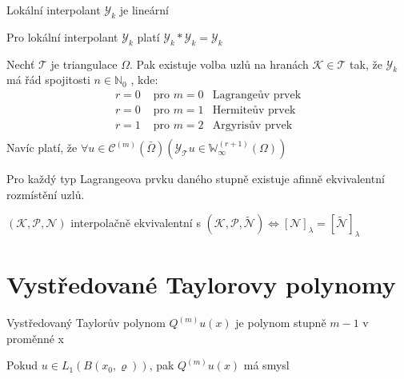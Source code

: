 \documentclass[../main.tex]{subfiles}
\begin{document}
\begin{claim}
    Lokální interpolant $\mathcal{Y}_k$ je lineární
\end{claim}

\begin{claim}
    Pro lokální interpolant $\mathcal{Y}_k$ platí  $\mathcal{Y}_k * \mathcal{Y}_k = \mathcal{Y}_k$
\end{claim}


\begin{claim}
    Nechť $\mathcal{T}$ je triangulace $\Omega$. Pak existuje volba uzlů na hranách $\mathcal{K}\in\mathcal{T}$ tak, že $\mathcal{Y}_k$ má řád spojitosti $n\in\mathbb{N}_0$ , kde:
\begin{align}
    r = 0 &  \text{ pro } m = 0    & \text{Lagrangeův prvek} \\ 
    r = 0 &  \text{ pro } m = 1    & \text{Hermiteův prvek} \\ 
    r = 1 &  \text{ pro } m = 2    & \text{Argyrisův prvek} \\ 
\end{align}
    Navíc platí, že $\forall u \in \mathcal{C}^{(m)}(\bar{\Omega}) (\mathcal{Y}_\mathcal{T}u\in \mathbb{W}_\infty^{(r+1)}(\Omega))$
\end{claim}



\begin{claim}
    Pro každý typ Lagrangeova prvku daného stupně existuje afinně ekvivalentní rozmístění uzlů.
\end{claim}


\begin{claim}
    $(\mathcal{K}, \mathcal{P}, \mathcal{N})$ interpolačně ekvivalentní s $({\mathcal{K}}, {\mathcal{P}}, \tilde{\mathcal{N}}) \Leftrightarrow [\mathcal{N}]_\lambda = [\tilde{\mathcal{N}}]_\lambda $
\end{claim}


\section{Vystředované Taylorovy polynomy}


\begin{claim}[T1]
    Vystředovaný Taylorův polynom $Q^{(m)} u(x)$ je polynom stupně $m-1$ v proměnné x
\end{claim}


\begin{claim}[T2]
    Pokud $u \in L_1(B(x_0, \varrho))$, pak $Q^{(m)} u(x)$ má smysl 
\end{claim}
\end{document}
